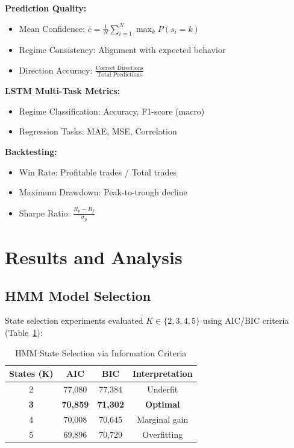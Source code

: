 \documentclass[conference]{IEEEtran}
\begin{document}
\textbf{Prediction Quality:}
\begin{itemize}
\item Mean Confidence: $\bar{c} = \frac{1}{N}\sum_{i=1}^{N}\max_k P(s_i=k)$
\item Regime Consistency: Alignment with expected behavior
\item Direction Accuracy: $\frac{\text{Correct Directions}}{\text{Total Predictions}}$
\end{itemize}

\textbf{LSTM Multi-Task Metrics:}
\begin{itemize}
\item Regime Classification: Accuracy, F1-score (macro)
\item Regression Tasks: MAE, MSE, Correlation
\end{itemize}

\textbf{Backtesting:}
\begin{itemize}
\item Win Rate: Profitable trades / Total trades
\item Maximum Drawdown: Peak-to-trough decline
\item Sharpe Ratio: $\frac{R_p - R_f}{\sigma_p}$
\end{itemize}

\section{Results and Analysis}

\subsection{HMM Model Selection}

State selection experiments evaluated $K \in \{2, 3, 4, 5\}$ using AIC/BIC criteria (Table~\ref{tab:hmm_states}):

\begin{table}[htbp]
\centering
\caption{HMM State Selection via Information Criteria}
\label{tab:hmm_states}
\begin{tabular}{cccc}
\toprule
\textbf{States (K)} & \textbf{AIC} & \textbf{BIC} & \textbf{Interpretation} \\
\midrule
2 & 77,080 & 77,384 & Underfit \\
\textbf{3} & \textbf{70,859} & \textbf{71,302} & \textbf{Optimal} \\
4 & 70,008 & 70,645 & Marginal gain \\
5 & 69,896 & 70,729 & Overfitting \\
\bottomrule
\end{tabular}
\end{table}
\end{document}
